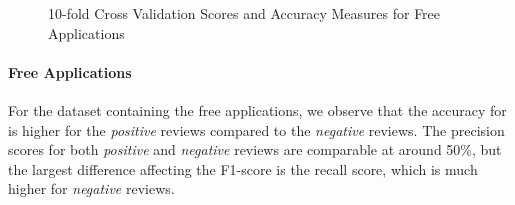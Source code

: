 \documentclass[11pt]{report} %
\begin{document}
\begin{figure}[h!]
\centering
{}
\caption[Optional caption for list of figures]{10-fold Cross Validation Scores and Accuracy Measures for Free Applications }
\label{fig:analysis_free}
\end{figure}

\paragraph{Free Applications} For the dataset containing the free applications, we observe that the accuracy for is higher for the \textit{positive} reviews compared to the \textit{negative} reviews. The precision scores for both \textit{positive} and \textit{negative} reviews are comparable at around 50\%, but the largest difference affecting the F1-score is the recall score, which is much higher for \textit{negative} reviews.
\end{document}
